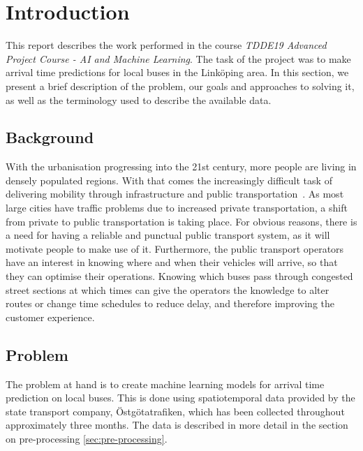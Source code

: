 


\chapter{Introduction}
\label{cha:introduction}
This report describes the work performed in the course \textit{TDDE19 Advanced Project Course - AI and Machine Learning}. The task of the project was to make arrival time predictions for local buses in the Link\"oping area. In this section, we present a brief description of the problem, our goals and approaches to solving it, as well as the terminology used to describe the available data.

\section{Background}
With the urbanisation progressing into the 21st century, more people are living in densely populated regions. With that comes the increasingly difficult task of delivering mobility through infrastructure and public transportation~\cite{kotter2004risks}. As most large cities have traffic problems due to increased private transportation, a shift from private to public transportation is taking place. For obvious reasons, there is a need for having a reliable and punctual public transport system, as it will motivate people to make use of it. Furthermore, the public transport operators have an interest in knowing where and when their vehicles will arrive, so that they can optimise their operations. Knowing which buses pass through congested street sections at which times can give the operators the knowledge to alter routes or change time schedules to reduce delay, and therefore improving the customer experience.

\section{Problem}
\label{sec:problem}
The problem at hand is to create machine learning models for arrival time prediction on local buses. This is done using spatiotemporal data provided by the state transport company, \"Ostg\"otatrafiken, which has been collected throughout approximately three months. The data is described in more detail in the section on pre-processing \ref{sec:pre-processing}.

